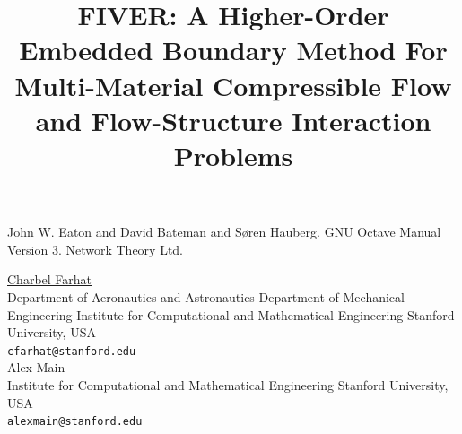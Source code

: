 \documentclass[article, A4, 11pt]{llncs}%
\begin{document}

\begin{thebibliography}{10}
{\sc John W. Eaton and David Bateman and Søren Hauberg}. {GNU Octave Manual Version 3}. Network Theory Ltd.
\end{thebibliography} %

\title{FIVER: A Higher-Order Embedded Boundary Method For Multi-Material Compressible Flow and Flow-Structure Interaction Problems}
 \author{} \institute{}
\maketitle
\begin{center}
{\large \underline{Charbel Farhat}}\\
Department of Aeronautics and Astronautics Department of Mechanical Engineering Institute for Computational and Mathematical Engineering Stanford University, USA\\
{\tt cfarhat@stanford.edu}
\\ \vspace{4mm}
{\large Alex Main}\\
Institute for Computational and Mathematical Engineering Stanford University, USA\\
{\tt alexmain@stanford.edu}
\end{center}
\end{document}
